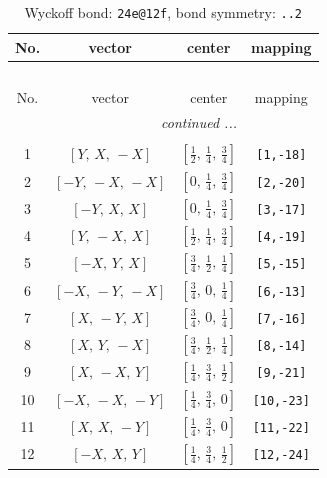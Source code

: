 \documentclass[fleqn,8pt]{jsarticle}
\begin{document}
\begin{longtable}{cccc}
\caption{Wyckoff bond: {\tt 24e@12f}, bond symmetry: {\tt ..2}}
 \\
 \hline \hline
No. & vector & center & mapping \\ \hline \endfirsthead

\multicolumn{3}{l}{\tablename\ \thetable{}} \\
 \hline \hline
No. & vector & center & mapping \\ \hline \endhead

 \hline \hline
\multicolumn{3}{r}{\footnotesize\it continued ...} \\ \endfoot

 \hline \hline
\multicolumn{3}{r}{} \\ \endlastfoot

1 & $\left[ Y,\, X,\, - X \right]$ & $\left[ \frac{1}{2},\, \frac{1}{4},\, \frac{3}{4} \right]$ & {\tt [1,-18]} \\ \hline
2 & $\left[ - Y,\, - X,\, - X \right]$ & $\left[ 0,\, \frac{1}{4},\, \frac{3}{4} \right]$ & {\tt [2,-20]} \\ \hline
3 & $\left[ - Y,\, X,\, X \right]$ & $\left[ 0,\, \frac{1}{4},\, \frac{3}{4} \right]$ & {\tt [3,-17]} \\ \hline
4 & $\left[ Y,\, - X,\, X \right]$ & $\left[ \frac{1}{2},\, \frac{1}{4},\, \frac{3}{4} \right]$ & {\tt [4,-19]} \\ \hline
5 & $\left[ - X,\, Y,\, X \right]$ & $\left[ \frac{3}{4},\, \frac{1}{2},\, \frac{1}{4} \right]$ & {\tt [5,-15]} \\ \hline
6 & $\left[ - X,\, - Y,\, - X \right]$ & $\left[ \frac{3}{4},\, 0,\, \frac{1}{4} \right]$ & {\tt [6,-13]} \\ \hline
7 & $\left[ X,\, - Y,\, X \right]$ & $\left[ \frac{3}{4},\, 0,\, \frac{1}{4} \right]$ & {\tt [7,-16]} \\ \hline
8 & $\left[ X,\, Y,\, - X \right]$ & $\left[ \frac{3}{4},\, \frac{1}{2},\, \frac{1}{4} \right]$ & {\tt [8,-14]} \\ \hline
9 & $\left[ X,\, - X,\, Y \right]$ & $\left[ \frac{1}{4},\, \frac{3}{4},\, \frac{1}{2} \right]$ & {\tt [9,-21]} \\ \hline
10 & $\left[ - X,\, - X,\, - Y \right]$ & $\left[ \frac{1}{4},\, \frac{3}{4},\, 0 \right]$ & {\tt [10,-23]} \\ \hline
11 & $\left[ X,\, X,\, - Y \right]$ & $\left[ \frac{1}{4},\, \frac{3}{4},\, 0 \right]$ & {\tt [11,-22]} \\ \hline
12 & $\left[ - X,\, X,\, Y \right]$ & $\left[ \frac{1}{4},\, \frac{3}{4},\, \frac{1}{2} \right]$ & {\tt [12,-24]} \\ \hline

\end{longtable}
\end{document}
